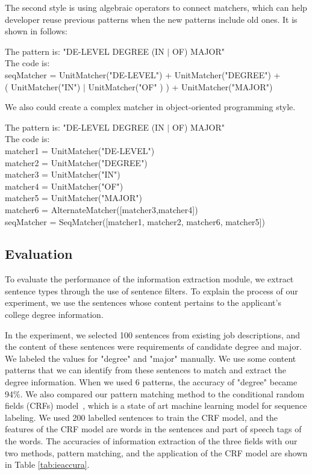 The second style is using algebraic operators to connect matchers, which can help developer reuse previous patterns when the new patterns include old ones. It is shown in follows:
\begin{framed}
\small
\noindent
The pattern is:  "DE-LEVEL DEGREE (IN $\vert$ OF) MAJOR" \\
The code is: \\
seqMatcher =  UnitMatcher("DE-LEVEL") +  UnitMatcher("DEGREE") + \\
\hspace{3cm} ( UnitMatcher("IN") $\vert$ UnitMatcher("OF" ) ) + UnitMatcher("MAJOR")

\end{framed}

We also could create a complex matcher in object-oriented programming style.

\begin{framed}
\small
\noindent
The pattern is:  "DE-LEVEL DEGREE (IN $\vert$ OF) MAJOR" \\
The code is: \\
matcher1 = UnitMatcher("DE-LEVEL") \\
matcher2 = UnitMatcher("DEGREE")  \\
matcher3 = UnitMatcher("IN")   \\
matcher4 = UnitMatcher("OF")   \\
matcher5 = UnitMatcher("MAJOR")  \\
matcher6 = AlternateMatcher([matcher3,matcher4])   \\
seqMatcher = SeqMatcher([matcher1, matcher2, matcher6, matcher5])

\end{framed}


\subsection{Evaluation}

To evaluate the performance of the information extraction module, we extract sentence types through the use of sentence filters. To explain the process of our experiment, we use the sentences whose content pertains to the applicant's college degree information.

In the experiment, we selected 100 sentences from existing job descriptions, and the content of these sentences were requirements of candidate degree and major. We labeled the values for "degree" and "major" manually. We use some content patterns that we can identify from these sentences to match and extract the degree information. When we used 6 patterns, the accuracy of "degree" became 94\%. We also compared our pattern matching method to the conditional random fields (CRFs) model~\cite{lafferty2001conditional}, which is a state of art machine learning model for sequence labeling. We used 200 labelled sentences to train the CRF model, and the features of the CRF model are words in the sentences and part of speech tags of the words. The accuracies of information extraction of the three fields with our two methods, pattern matching, and the application of the CRF model are shown in Table \ref{tab:ieaccura}.


